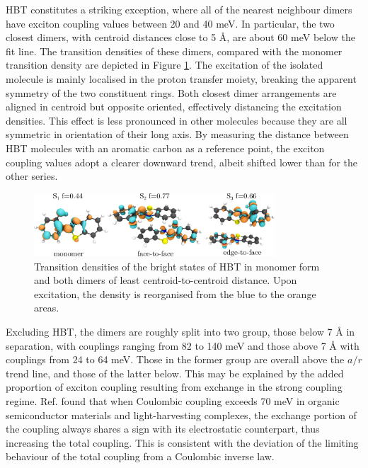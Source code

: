 HBT constitutes a striking exception, where all of the nearest neighbour dimers have exciton coupling values between 20 and 40 meV. In particular, the two closest dimers, with centroid distances close to 5 \AA{}, are about 60 meV below the fit line. The transition densities of these dimers, compared with the monomer transition density are depicted in Figure \ref{fig:hbt_dens}. The excitation of the isolated molecule is mainly localised in the proton transfer moiety, breaking the apparent symmetry of the two constituent rings. Both closest dimer arrangements are aligned in centroid but opposite oriented, effectively distancing the excitation densities. This effect is less pronounced in other molecules because they are all symmetric in orientation of their long axis. By measuring the distance between HBT molecules with an aromatic carbon as a reference point, the exciton coupling values adopt a clearer downward trend, albeit shifted lower than for the other series.

\begin{figure}
\centering
\includegraphics[width=9cm]{Chapters/7Applications/hbt_dens.pdf}
\caption{Transition densities of the bright states of HBT in monomer form and both dimers of least centroid-to-centroid distance. Upon excitation, the density is reorganised from the blue to the orange areas.}
\label{fig:hbt_dens}
\end{figure}

Excluding HBT, the dimers are roughly split into two group, those below 7 \AA{} in separation, with couplings ranging from 82 to 140 meV and those above 7 \AA{} with couplings from 24 to 64 meV. Those in the former group are overall above the $a/r$ trend line, and those of the latter below. This may be explained by the added proportion of exciton coupling resulting from exchange in the strong coupling regime. Ref.  found that when Coulombic coupling exceeds 70 meV in organic semiconductor materials and light-harvesting complexes, the exchange portion of the coupling always shares a sign with its electrostatic counterpart, thus increasing the total coupling. This is consistent with the deviation of the limiting behaviour of the total coupling from a Coulombic inverse law.

